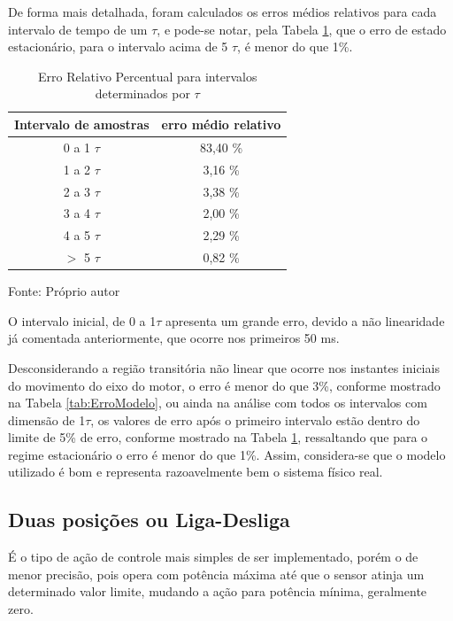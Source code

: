 De forma mais detalhada, 
foram calculados os erros médios relativos para cada intervalo de 
tempo de um $\tau$, 
e pode-se notar, 
pela Tabela \ref{tab:ErroModeloTau}, 
que o erro de estado estacionário, para o intervalo acima de 5 $\tau$, é menor do que 1\%. 


\begin{table}[h]
\centering
\caption{Erro Relativo Percentual para intervalos determinados por $\tau$ }
\label{tab:ErroModeloTau}

\begin{tabular}{c|c}
\hline
Intervalo de amostras  &  erro médio relativo \\ \hline
\hline
0 a 1 $\tau$ & 83,40 \% \\ \hline
1 a 2 $\tau$ &  3,16 \% \\ \hline
2 a 3 $\tau$ &  3,38 \% \\ \hline
3 a 4 $\tau$ &  2,00 \% \\ \hline
4 a 5 $\tau$ &  2,29 \% \\ \hline
$>$ 5 $\tau$ &  0,82 \% \\ \hline
\end{tabular}

{\small Fonte: Próprio autor}
\end{table}

O intervalo inicial, de 0 a 1$\tau$ apresenta um grande erro, devido a não linearidade já comentada anteriormente, que ocorre nos primeiros 50 ms. 

Desconsiderando a região transitória não linear 
que ocorre nos instantes iniciais do movimento do eixo do motor, 
o erro é menor do que 3\%, conforme mostrado na Tabela \ref{tab:ErroModelo},
ou ainda na análise com todos os intervalos com dimensão de 1$\tau$, 
os valores de erro após o primeiro intervalo 
estão dentro do limite de 5\% de erro,  
conforme mostrado na Tabela \ref{tab:ErroModeloTau}, 
ressaltando que para o regime estacionário o erro é menor do que 1\%.
Assim, considera-se que o modelo utilizado é bom e representa razoavelmente bem o sistema físico real.


















\subsection{ Duas posições ou Liga-Desliga }
É o tipo de ação de controle mais simples de ser implementado, porém o de menor precisão, pois opera com potência máxima até que o sensor atinja um determinado valor limite, mudando a ação para potência mínima, geralmente zero.

